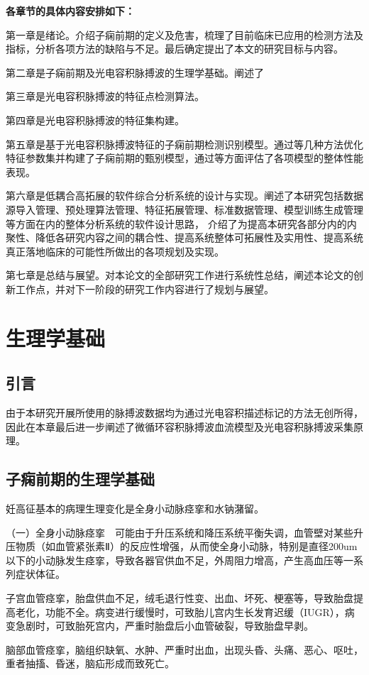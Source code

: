 \textbf{各章节的具体内容安排如下：}

第一章是绪论。介绍子痫前期的定义及危害，梳理了目前临床已应用的检测方法及指标，分析各项方法的缺陷与不足。最后确定提出了本文的研究目标与内容。

第二章是子痫前期及光电容积脉搏波的生理学基础。阐述了

第三章是光电容积脉搏波的特征点检测算法。

第四章是光电容积脉搏波的特征集构建。

第五章是基于光电容积脉搏波特征的子痫前期检测识别模型。通过等几种方法优化特征参数集并构建了子痫前期的甄别模型，通过等方面评估了各项模型的整体性能表现。

第六章是低耦合高拓展的软件综合分析系统的设计与实现。阐述了本研究包括数据源导入管理、预处理算法管理、特征拓展管理、标准数据管理、模型训练生成管理等方面在内的整体分析系统的软件设计思路，
介绍了为提高本研究各部分内的内聚性、降低各研究内容之间的耦合性、提高系统整体可拓展性及实用性、提高系统真正落地临床的可能性所做出的各项规划及实现。

第七章是总结与展望。对本论文的全部研究工作进行系统性总结，阐述本论文的创新工作点，并对下一阶段的研究工作内容进行了规划与展望。

\chapter{生理学基础}
\section{引言}
由于本研究开展所使用的脉搏波数据均为通过光电容积描述标记的方法无创所得，因此在本章最后进一步阐述了微循环容积脉搏波血流模型及光电容积脉搏波采集原理。
\section{子痫前期的生理学基础}
妊高征基本的病理生理变化是全身小动脉痉挛和水钠潴留。

（一）全身小动脉痉挛　可能由于升压系统和降压系统平衡失调，血管壁对某些升压物质（如血管紧张素Ⅱ）的反应性增强，从而使全身小动脉，特别是直径200um以下的小动脉发生痉挛，导致各器官供血不足，外周阻力增高，产生高血压等一系列症状体征。

子宫血管痉挛，胎盘供血不足，绒毛退行性变、出血、坏死、梗塞等，导致胎盘提高老化，功能不全。病变进行缓慢时，可致胎儿宫内生长发育迟缓（IUGR），病变急剧时，可致胎死宫内，严重时胎盘后小血管破裂，导致胎盘早剥。

脑部血管痉挛，脑组织缺氧、水肿、严重时出血，出现头昏、头痛、恶心、呕吐，重者抽搐、昏迷，脑疝形成而致死亡。

